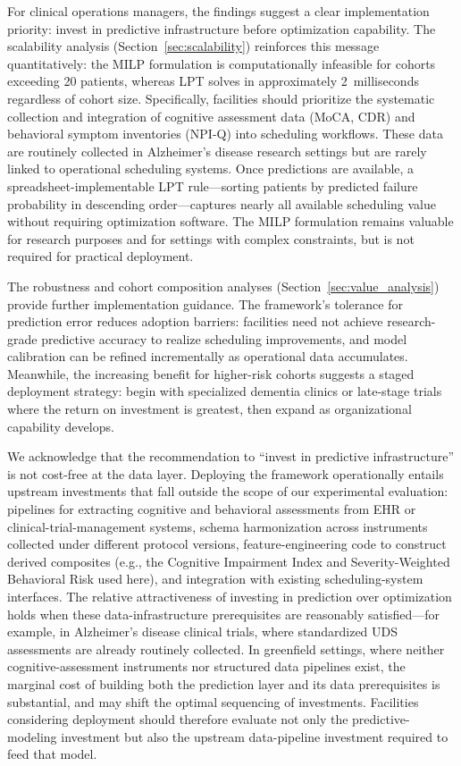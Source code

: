 \documentclass[11pt,a4paper]{article}
\begin{document}
For clinical operations managers, the findings suggest a clear implementation priority: invest in predictive infrastructure before optimization capability. The scalability analysis (Section~\ref{sec:scalability}) reinforces this message quantitatively: the MILP formulation is computationally infeasible for cohorts exceeding 20 patients, whereas LPT solves in approximately 2~milliseconds regardless of cohort size. Specifically, facilities should prioritize the systematic collection and integration of cognitive assessment data (MoCA, CDR) and behavioral symptom inventories (NPI-Q) into scheduling workflows. These data are routinely collected in Alzheimer's disease research settings but are rarely linked to operational scheduling systems. Once predictions are available, a spreadsheet-implementable LPT rule---sorting patients by predicted failure probability in descending order---captures nearly all available scheduling value without requiring optimization software. The MILP formulation remains valuable for research purposes and for settings with complex constraints, but is not required for practical deployment.

The robustness and cohort composition analyses (Section~\ref{sec:value_analysis}) provide further implementation guidance. The framework's tolerance for prediction error reduces adoption barriers: facilities need not achieve research-grade predictive accuracy to realize scheduling improvements, and model calibration can be refined incrementally as operational data accumulates. Meanwhile, the increasing benefit for higher-risk cohorts suggests a staged deployment strategy: begin with specialized dementia clinics or late-stage trials where the return on investment is greatest, then expand as organizational capability develops.

We acknowledge that the recommendation to ``invest in predictive infrastructure'' is not cost-free at the data layer. Deploying the framework operationally entails upstream investments that fall outside the scope of our experimental evaluation: pipelines for extracting cognitive and behavioral assessments from EHR or clinical-trial-management systems, schema harmonization across instruments collected under different protocol versions, feature-engineering code to construct derived composites (e.g., the Cognitive Impairment Index and Severity-Weighted Behavioral Risk used here), and integration with existing scheduling-system interfaces. The relative attractiveness of investing in prediction over optimization holds when these data-infrastructure prerequisites are reasonably satisfied---for example, in Alzheimer's disease clinical trials, where standardized UDS assessments are already routinely collected. In greenfield settings, where neither cognitive-assessment instruments nor structured data pipelines exist, the marginal cost of building both the prediction layer and its data prerequisites is substantial, and may shift the optimal sequencing of investments. Facilities considering deployment should therefore evaluate not only the predictive-modeling investment but also the upstream data-pipeline investment required to feed that model.
\end{document}

